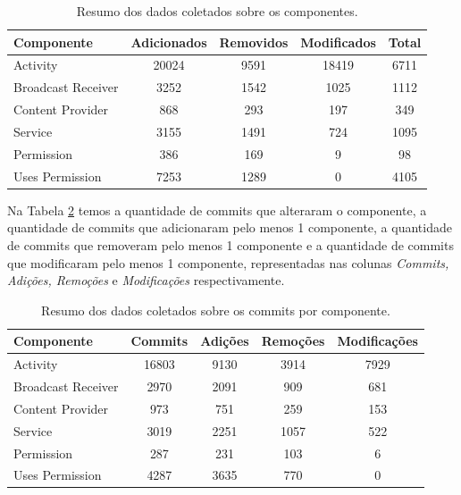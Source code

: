 \documentclass[a4paper,12pt]{article}
\begin{document}
{\begin{table}[h]
\begin{center}
\begin{tabular}{l|c|c|c|c}

 Componente &  Adicionados & Removidos & Modificados & Total \\
\hline
Activity &  20024 & 9591 & 18419 & 6711 \\
Broadcast Receiver  & 3252 & 1542 & 1025 & 1112 \\
Content Provider  & 868 & 293 & 197 & 349 \\
Service & 3155 & 1491 & 724 & 1095 \\
Permission  & 386 & 169 & 9 & 98 \\
Uses Permission & 7253 & 1289 & 0 & 4105 \\
\end{tabular}
\caption{Resumo dos dados coletados sobre os componentes.}
\label{tab:statistcs}
\end{center}
\end{table}


Na Tabela \ref{tab:stat} temos a quantidade de commits que alteraram o componente, a quantidade de commits que adicionaram pelo menos 1 componente, a quantidade de commits que removeram pelo menos 1 componente e a quantidade de commits que modificaram pelo menos 1 componente, representadas nas colunas \textit{Commits, Adições, Remoções} e \textit{Modificações} respectivamente. 


\begin{table}[h]
\begin{center}
\begin{tabular}{l|c|c|c|c}

Componente & Commits & Adições & Remoções & Modificações \\
\hline
Activity & 16803 & 9130 & 3914 & 7929 \\
Broadcast Receiver & 2970 & 2091 & 909 & 681 \\
Content Provider & 973 & 751 & 259 & 153 \\
Service & 3019 & 2251 & 1057 & 522 \\
Permission & 287 & 231 & 103 & 6 \\
Uses Permission & 4287 & 3635 & 770 & 0 \\
\end{tabular}
\caption{Resumo dos dados coletados sobre os commits por componente.}
\label{tab:stat}
\end{center}
\end{table}




}
\end{document}
